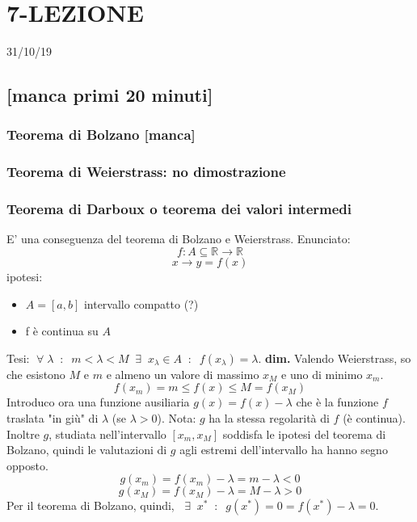 \section*{7-LEZIONE}
31/10/19
\subsection*{[manca primi 20 minuti]}
\subsubsection*{Teorema di Bolzano [manca]}
\subsubsection*{Teorema di Weierstrass: no dimostrazione}
\subsubsection*{Teorema di Darboux o teorema dei valori intermedi}
E' una conseguenza del teorema di Bolzano e Weierstrass.\newline
Enunciato:
\[
    f:A \subseteq \mathbb{R} \longrightarrow \mathbb{R} 
\]
\[
    x \longrightarrow y=f(x)
\]
ipotesi:
\begin{itemize}
    \item $A=[a,b]$ intervallo compatto (?)
    \item f è continua su $A$
\end{itemize}
Tesi:\newline
$\;\forall\;\lambda \;\;:\;\; m < \lambda< M \;\;\exists\;\; x_\lambda \in A \;\;:\;\; f(x_\lambda) = \lambda$.\newline
\textbf{dim.} Valendo Weierstrass, so che esistono $M$ e $m$ e almeno un valore di massimo $x_M$ e uno di minimo $x_m$.
\[
    f(x_m) = m \leq f(x) \leq M = f(x_M)
\]
Introduco ora una funzione ausiliaria $g(x) = f(x) - \lambda$ che è la funzione $f$ traslata "in giù" di $\lambda$ (se $\lambda > 0$). \newline
Nota: $g$ ha la stessa regolarità di $f$ (è continua).\newline
Inoltre $g$, studiata nell'intervallo $[x_m,x_M]$ soddisfa le ipotesi del teorema di Bolzano, quindi le valutazioni di $g$ agli estremi dell'intervallo ha hanno segno opposto.
\[
    g(x_m) = f(x_m) - \lambda = m-\lambda < 0
\]
\[
    g(x_M) = f(x_M) - \lambda = M-\lambda > 0
\]
Per il teorema di Bolzano, quindi, $\;\;\exists\;\; x^* \;\;:\;\; g(x^*) = 0 = f(x^*)-\lambda = 0$.\newline
\newline
\newline
